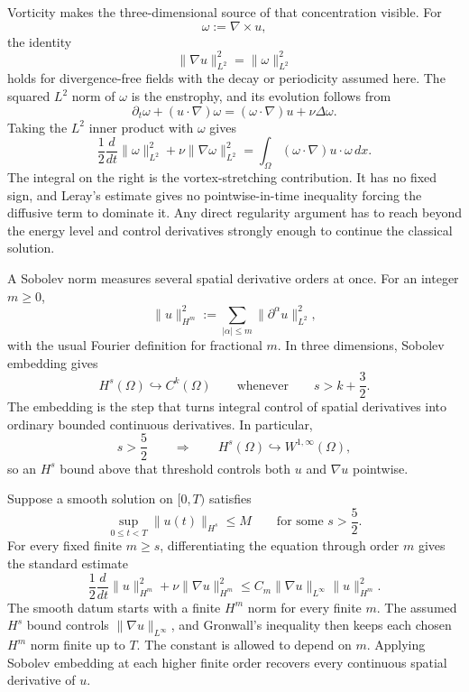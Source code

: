 Vorticity makes the three-dimensional source of that concentration visible.
For
\[
  \omega:=\nabla\times u,
\]
the identity
\[
  \lVert\nabla u\rVert_{L^2}^{2}
  =
  \lVert\omega\rVert_{L^2}^{2}
\]
holds for divergence-free fields with the decay or periodicity assumed here.
The squared \(L^2\) norm of \(\omega\) is the enstrophy, and its evolution follows from
\[
  \partial_t\omega+(u\cdot\nabla)\omega
  =
  (\omega\cdot\nabla)u+\nu\Delta\omega.
\]
Taking the \(L^2\) inner product with \(\omega\) gives
\[
  \frac12\frac{d}{dt}\lVert\omega\rVert_{L^2}^{2}
  +
  \nu\lVert\nabla\omega\rVert_{L^2}^{2}
  =
  \int_\Omega(\omega\cdot\nabla)u\cdot\omega\,dx.
\]
The integral on the right is the vortex-stretching contribution.
It has no fixed sign, and Leray's estimate gives no pointwise-in-time inequality forcing the diffusive term to dominate it.
Any direct regularity argument has to reach beyond the energy level and control derivatives strongly enough to continue the classical solution.


A Sobolev norm measures several spatial derivative orders at once.
For an integer \(m\geq0\),
\[
  \lVert u\rVert_{H^m}^{2}
  :=
  \sum_{|\alpha|\leq m}
  \lVert\partial^\alpha u\rVert_{L^2}^{2},
\]
with the usual Fourier definition for fractional \(m\).
In three dimensions, Sobolev embedding gives \parencite[Theorem~7.28]{Cerda2010}
\[
  H^s(\Omega)\hookrightarrow C^k(\Omega)
  \qquad
  \text{whenever}
  \qquad
  s>k+\frac32.
\]
The embedding is the step that turns integral control of spatial derivatives into ordinary bounded continuous derivatives.
In particular,
\[
  s>\frac52
  \qquad\Longrightarrow\qquad
  H^s(\Omega)\hookrightarrow W^{1,\infty}(\Omega),
\]
so an \(H^s\) bound above that threshold controls both \(u\) and \(\nabla u\) pointwise.

Suppose a smooth solution on \([0,T)\) satisfies
\[
  \sup_{0\leq t<T}\lVert u(t)\rVert_{H^s}
  \leq M
  \qquad
  \text{for some }s>\frac52.
\]
For every fixed finite \(m\geq s\), differentiating the equation through order \(m\) gives the standard estimate
\[
  \frac12\frac{d}{dt}\lVert u\rVert_{H^m}^{2}
  +
  \nu\lVert\nabla u\rVert_{H^m}^{2}
  \leq
  C_m\lVert\nabla u\rVert_{L^\infty}
  \lVert u\rVert_{H^m}^{2}.
\]
The smooth datum starts with a finite \(H^m\) norm for every finite \(m\).
The assumed \(H^s\) bound controls \(\lVert\nabla u\rVert_{L^\infty}\), and Gronwall's inequality then keeps each chosen \(H^m\) norm finite up to \(T\).
The constant is allowed to depend on \(m\).
Applying Sobolev embedding at each higher finite order recovers every continuous spatial derivative of \(u\).

